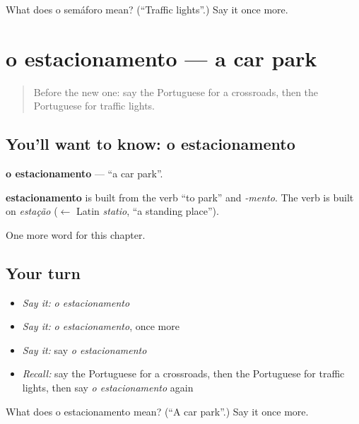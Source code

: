 \begin{tcolorbox}[breakable,colback=teal!4,colframe=teal!35!black,title={Before you move on}]
What does o semáforo mean? (\textquotedblleft{}Traffic lights\textquotedblright{}.) Say it once more.
\end{tcolorbox}
\section[o estacionamento]{o estacionamento — a car park}

\label{lesson:PT-C87-estacionamento}



\begin{quote}
Before the new one: say the Portuguese for a crossroads, then the Portuguese for traffic lights.
\end{quote}

\subsection*{You'll want to know: o estacionamento}
\textbf{o estacionamento} — \textquotedblleft{}a car park\textquotedblright{}.

\begin{cousinweb}
\textbf{estacionamento} is built from the verb \textquotedblleft{}to park\textquotedblright{} and \emph{-mento}. The verb is built on \emph{estação} ($\leftarrow$ Latin \emph{statio}, \textquotedblleft{}a standing place\textquotedblright{}).
\end{cousinweb}

\begin{grammarlens}[title={What you've built}]
One more word for this chapter.
\end{grammarlens}

\subsection*{Your turn}
\begin{itemize}
\raggedright
  \item \emph{Say it:} \emph{o estacionamento}
  \item \emph{Say it:} \emph{o estacionamento}, once more
  \item \emph{Say it:} say \emph{o estacionamento}
  \item \emph{Recall:} say the Portuguese for a crossroads, then the Portuguese for traffic lights, then say \emph{o estacionamento} again
\end{itemize}

\begin{tcolorbox}[breakable,colback=teal!4,colframe=teal!35!black,title={Before you move on}]
What does o estacionamento mean? (\textquotedblleft{}A car park\textquotedblright{}.) Say it once more.
\end{tcolorbox}
